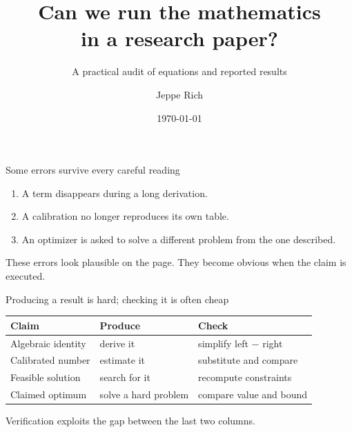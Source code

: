 \documentclass[aspectratio=169,11pt]{beamer}
\title{\bfseries Can we run the mathematics\\in a research paper?}
\subtitle{A practical audit of equations and reported results}
\author{Jeppe Rich}
\institute{DTU Management}
\date{\today}
\begin{document}
\begin{frame}[plain]
  \titlepage
\end{frame}

\begin{frame}{Some errors survive every careful reading}
  \begin{enumerate}\itemsep0.8em
    \item A term disappears during a long derivation.
    \item A calibration no longer reproduces its own table.
    \item An optimizer is asked to solve a different problem from the one described.
  \end{enumerate}
  \vfill
  \begin{block}{}
    \centering
    These errors look plausible on the page. They become obvious when the claim is executed.
  \end{block}
\end{frame}

\begin{frame}{Producing a result is hard; checking it is often cheap}
  \begin{center}
  \begin{tabular}{@{}p{}p{}p{}@{}}
    \toprule
    \textbf{Claim} & \textbf{Produce} & \textbf{Check} \\
    \midrule
    Algebraic identity & derive it & simplify left $-$ right \\[0.35em]
    Calibrated number & estimate it & substitute and compare \\[0.35em]
    Feasible solution & search for it & recompute constraints \\[0.35em]
    Claimed optimum & solve a hard problem & compare value and bound \\
    \bottomrule
  \end{tabular}
  \end{center}
  \vfill
  \centering\large\alert{Verification exploits the gap between the last two columns.}
\end{frame}
\end{document}

